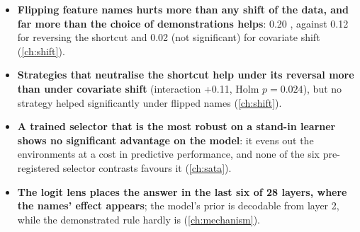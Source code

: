 \begin{itemize}[leftmargin=1.5em]
  \item \textbf{Flipping feature names hurts more than any shift of the data, and far more than the choice of demonstrations helps}: 0.20 \AUROC, against 0.12 for reversing the shortcut and 0.02 (not significant) for covariate shift (\autoref{ch:shift}).
  \item \textbf{Strategies that neutralise the shortcut help under its reversal more than under covariate shift} (interaction +0.11, Holm $p = 0.024$), but no strategy helped significantly under flipped names (\autoref{ch:shift}).
  \item \textbf{A trained selector that is the most robust on a stand-in learner shows no significant advantage on the model}: it evens out the environments at a cost in predictive performance, and none of the six pre-registered selector contrasts favours it (\autoref{ch:sata}).
  \item \textbf{The logit lens places the answer in the last six of 28 layers, where the names' effect appears}; the model's prior is decodable from layer 2, while the demonstrated rule hardly is (\autoref{ch:mechanism}).
\end{itemize}